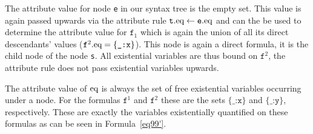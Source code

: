 The attribute value for node \texttt{e} in our syntax tree is the empty set.
This value is again passed upwards via the attribute rule $\texttt{t}.\text{eq}\leftarrow \texttt{e}.\text{eq}$ %
and can the be used to determine the attribute value for $\texttt{f}_1$
which is again the union of all its direct descendants' 
values ($\texttt{f}^2.\text{eq} = \{\texttt{\_:x}\}$).
This node is again a direct formula, it is the child node of the node \texttt{s}. All existential variables are thus bound on $\texttt{f}^2$, the attribute rule does not pass
existential variables upwards. %

The attribute value of $\text{eq}$ is always the set of free existential variables occurring under a node. For the formulas $\texttt{f}^1$ 
and $\texttt{f}^2$ these are the sets $\texttt{\{\_:x\}}$ and $\texttt{\{\_:y\}}$, respectively. These are exactly the variables existentially quantified on these formulas as can be seen in 
Formula~\ref{eq99'}.

% 
% 
% 

